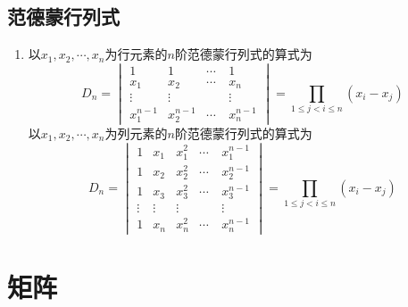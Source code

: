 \documentclass[12pt,a4paper,UTF8]{book}
\begin{document}
\subsection{范德蒙行列式}
\begin{enumerate}[]
\item 以$x_1,x_2,\cdots,x_n$为行元素的$n$阶范德蒙行列式的算式为
\[D_n=\begin{vmatrix}1&1&\cdots&1\\x_1&x_2&\cdots&x_n\\\vdots&\vdots&\quad&\vdots\\x_1^{n-1}&x_2^{n-1}&\cdots&x_n^{n-1}\end{vmatrix}=\prod\limits_{1\leq j<i\leq n}\left(x_i-x_j\right)\]
以$x_1,x_2,\cdots,x_n$为列元素的$n$阶范德蒙行列式的算式为
\[D_n=\begin{vmatrix}1&x_1&x_1^2&\cdots&x_1^{n-1}\\1&x_2&x_2^2&\cdots&x_2^{n-1}\\1&x_3&x_3^2&\cdots&x_3^{n-1}\\\vdots&\vdots&\vdots&\quad&\vdots\\1&x_n&x_n^2&\cdots&x_n^{n-1}\end{vmatrix}=\prod\limits_{1\leq j<i\leq n}\left(x_i-x_j\right)\]
\end{enumerate}


\section{矩阵}
\end{document}
